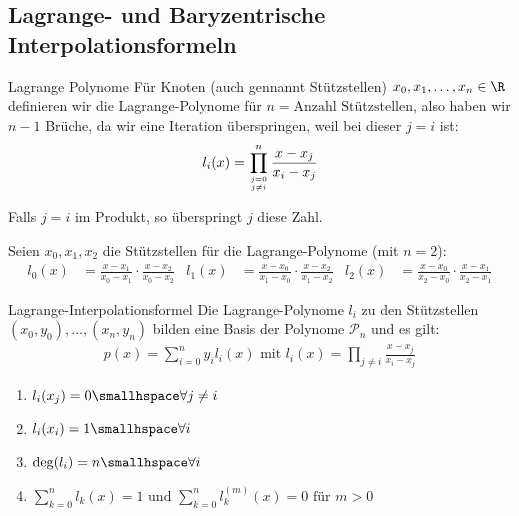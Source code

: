 
\newsection
\subsection{Lagrange- und Baryzentrische Interpolationsformeln}
\label{sec:barycentric-interpolation}

\begin{definition}[]{Lagrange Polynome}
    Für Knoten (auch gennannt Stützstellen) $x_0, x_1, \ldots, x_n \in \R$ definieren wir die Lagrange-Polynome für $n = \text{Anzahl Stützstellen}$, also haben wir $n - 1$ Brüche, da wir eine Iteration überspringen, weil bei dieser $j = i$ ist:
	\begin{align*}
		l_i(x) = \prod_{j = 0 \atop j \neq i}^n \frac{x - x_j}{x_i - x_j}
	\end{align*}
\end{definition}
Falls $j = i$ im Produkt, so überspringt $j$ diese Zahl.

\inlineex Seien $x_0, x_1, x_2$ die Stützstellen für die Lagrange-Polynome (mit $n = 2$):
\begin{align*}
	l_0(x) & = \frac{x - x_1}{x_0 - x_1} \cdot \frac{x - x_2}{x_0 - x_2} &
	l_1(x) & = \frac{x - x_0}{x_1 - x_0} \cdot \frac{x - x_2}{x_1 - x_2} &
	l_2(x) & = \frac{x - x_0}{x_2 - x_0} \cdot \frac{x - x_1}{x_2 - x_1}
\end{align*}


\begin{theorem}[]{Lagrange-Interpolationsformel}
	Die Lagrange-Polynome $l_i$ zu den Stützstellen $(x_0, y_0), \ldots, (x_n, y_n)$ bilden eine Basis der Polynome $\mathcal{P}_n$ und es gilt:
	\begin{align*}
		p(x) = \sum_{i = 0}^{n} y_i l_i(x) \text{ mit } l_i(x) = \prod_{j \neq i} \frac{x - x_j}{x_i - x_j}
	\end{align*}
\end{theorem}


\rmvspace
\begin{multicols}{2}
	\begin{enumerate}
		\item $l_i(x_j) = 0 \smallhspace \forall j \neq i$
		\item $l_i(x_i) = 1 \smallhspace \forall i$
		\item $\deg(l_i) = n \smallhspace \forall i$
		\item $\sum_{k = 0}^{n} l_k(x) = 1 \text{ und } \sum_{k = 0}^{n} l_k^{(m)}(x) = 0 \text{ für } m > 0$
	\end{enumerate}
\end{multicols}

